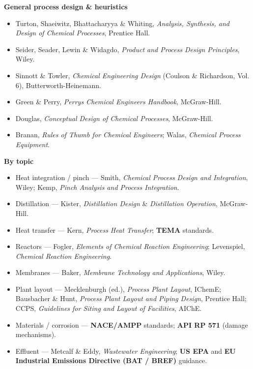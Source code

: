 \documentclass[11pt,a4paper]{article}
\providecommand{\tightlist}{\setlength{\itemsep}{0pt}\setlength{\parskip}{0pt}}
\begin{document}
\textbf{General process design \& heuristics}

\begin{itemize}
\tightlist
\item
  Turton, Shaeiwitz, Bhattacharyya \& Whiting, \emph{Analysis,
  Synthesis, and Design of Chemical Processes}, Prentice Hall.
\item
  Seider, Seader, Lewin \& Widagdo, \emph{Product and Process Design
  Principles}, Wiley.
\item
  Sinnott \& Towler, \emph{Chemical Engineering Design} (Coulson \&
  Richardson, Vol. 6), Butterworth-Heinemann.
\item
  Green \& Perry, \emph{Perry\textquotesingle s Chemical
  Engineers\textquotesingle{} Handbook}, McGraw-Hill.
\item
  Douglas, \emph{Conceptual Design of Chemical Processes}, McGraw-Hill.
\item
  Branan, \emph{Rules of Thumb for Chemical Engineers}; Walas,
  \emph{Chemical Process Equipment}.
\end{itemize}

\textbf{By topic}

\begin{itemize}
\tightlist
\item
  Heat integration / pinch --- Smith, \emph{Chemical Process Design and
  Integration}, Wiley; Kemp, \emph{Pinch Analysis and Process
  Integration}.
\item
  Distillation --- Kister, \emph{Distillation Design} \&
  \emph{Distillation Operation}, McGraw-Hill.
\item
  Heat transfer --- Kern, \emph{Process Heat Transfer}; \textbf{TEMA}
  standards.
\item
  Reactors --- Fogler, \emph{Elements of Chemical Reaction Engineering};
  Levenspiel, \emph{Chemical Reaction Engineering}.
\item
  Membranes --- Baker, \emph{Membrane Technology and Applications},
  Wiley.
\item
  Plant layout --- Mecklenburgh (ed.), \emph{Process Plant Layout},
  IChemE; Bausbacher \& Hunt, \emph{Process Plant Layout and Piping
  Design}, Prentice Hall; CCPS, \emph{Guidelines for Siting and Layout of
  Facilities}, AIChE.
\item
  Materials / corrosion --- \textbf{NACE/AMPP} standards; \textbf{API RP
  571} (damage mechanisms).
\item
  Effluent --- Metcalf \& Eddy, \emph{Wastewater Engineering};
  \textbf{US EPA} and \textbf{EU Industrial Emissions Directive (BAT /
  BREF)} guidance.
\end{itemize}
\end{document}
